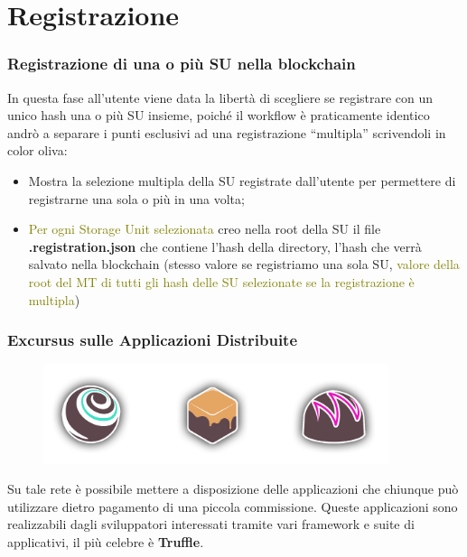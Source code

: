 \documentclass{beamer}
\begin{document}
\section{Registrazione}
\begin{frame}
	\frametitle{Registrazione di una o più SU nella blockchain}
	In questa fase all'utente viene data la libertà di scegliere se registrare con un unico hash una o più SU insieme, poiché il workflow è praticamente identico andrò a separare i punti esclusivi ad una registrazione “multipla” scrivendoli in color oliva:
	\begin{itemize}
		\item Mostra la selezione multipla della SU registrate dall'utente per permettere di registrarne una sola o più in una volta;
		\item \textcolor{olive}{Per ogni Storage Unit selezionata} creo nella root della SU il file \textbf{.registration.json} che contiene l'hash della directory, l'hash che verrà salvato nella blockchain (stesso valore se registriamo una sola SU, \textcolor{olive}{valore della root del MT di tutti gli hash delle SU selezionate se la registrazione è multipla})
	\end{itemize}
\end{frame}
\begin{frame}
	\frametitle{Excursus sulle Applicazioni Distribuite}
	\begin{figure}
		\includegraphics[width=0.90\textwidth]{figures/truffle.png}
	\end{figure}
	\bigskip
	Su tale rete è possibile mettere a disposizione delle applicazioni che chiunque può utilizzare dietro pagamento di una piccola commissione. Queste applicazioni sono realizzabili dagli sviluppatori interessati tramite vari framework e suite di applicativi, il più celebre è \textbf{Truffle}.
\end{frame}
\end{document}
